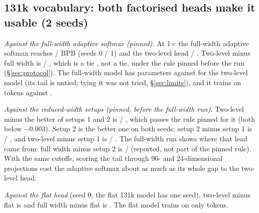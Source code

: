 \documentclass[11pt]{article}
\theoremstyle{remark}
\begin{document}
\subsection{131k vocabulary: both factorised heads make it usable (2 seeds)}\label{sec:big}
\emph{Against the full-width adaptive softmax (pinned).} At 1$\times$ the full-width adaptive softmax reaches \BigAwZero{} /
\BigAwOne{} BPB (seeds 0 / 1) and the two-level head \BigTlZero{} / \BigTlOne{}. Two-level minus full width is \BigDwZero{} /
\BigDwOne{}, which is \ifwidetie a tie \else \WideVerdict{}, not a tie, \fi under the rule pinned before the run
(\S\ref{sec:protocol}). The full-width model has \ParamsAsBigW{} parameters against \ParamsTlBig{} for the two-level model (its tail is untied; tying
it was not tried, \S\ref{sec:limits}), and
it trains on \TokAw{} tokens against \TokHcharged{}.

\emph{Against the reduced-width setups (pinned, before the full-width run).} Two-level minus the better of setups 1 and 2 is
\BigDZero{} / \BigDOne{}, which passes the rule pinned for it (both below $-0.003$). Setup 2 is the better one on both seeds;
setup 2 minus setup 1 is \BigCfgZero{} / \BigCfgOne{}, and two-level minus setup 1 is \BigDOldZero{} / \BigDOldOne{}. The
full-width run shows where that lead came from: full width minus setup 2 is \BigWidZero{} / \BigWidOne{} (reported, not part
of the pinned rule). With the same cutoffs, scoring the tail through 96- and 24-dimensional projections cost the adaptive
softmax about as much as its whole gap to the two-level head.

\emph{Against the flat head} (seed 0; the flat 131k model has one seed), two-level minus flat is \BigDFlat{} and full width
minus flat is \AwDFlat{}. The flat model trains on only \TokFbig{} tokens.
\end{document}
